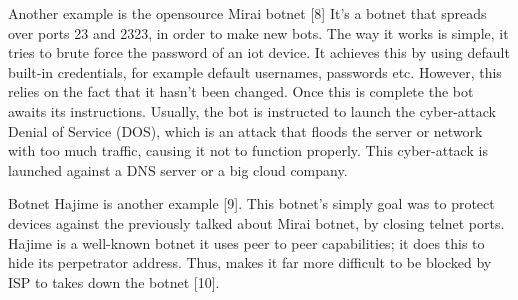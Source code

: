 \documentclass[../main.tex]{subfiles}
\begin{document}
Another example is the opensource Mirai botnet [8] 
It's a botnet that spreads over ports 23 and 2323, in order to make new bots. 
The way it works is simple, it tries to brute force the password of an iot device. 
It achieves this by using default built-in credentials, for example default usernames, passwords etc. However, this relies on the fact that it hasn't been changed. 
Once this is complete the bot awaits its instructions. 
Usually, the bot is instructed to launch the cyber-attack Denial of Service (DOS), which is an attack that floods the server or network with too much traffic, causing it not to function properly. 
This cyber-attack is launched against a DNS server or a big cloud company. 

Botnet Hajime is another example [9]. 
This botnet's simply goal was to protect devices against the previously talked about Mirai botnet, by closing telnet ports. 
Hajime is a well-known botnet it uses peer to peer capabilities; it does this to hide its perpetrator address. 
Thus, makes it far more difficult to be blocked by ISP to takes down the botnet [10].
\end{document}

